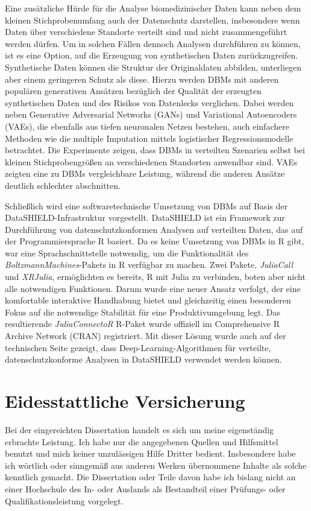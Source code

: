 \documentclass[12pt]{article}
\newcommand{\apkg}[1]{\emph{#1}}
\begin{document}
\begin{appendices}
Eine zusätzliche Hürde für die Analyse biomedizinischer Daten kann neben dem kleinen Stichprobenumfang auch der Datenschutz darstellen, insbesondere wenn Daten über verschiedene Standorte verteilt sind und nicht zusammengeführt werden dürfen.
Um in solchen Fällen dennoch Analysen durchführen zu können, ist es eine Option, auf die Erzeugung von synthetischen Daten zurückzugreifen.
Synthetische Daten können die Struktur der Originaldaten abbilden, unterliegen aber einem geringeren Schutz als diese.
Hierzu werden DBMs mit anderen populären generativen Ansätzen bezüglich der Qualität der erzeugten synthetischen Daten und des Risikos von Datenlecks verglichen.
Dabei werden neben Generative Adversarial Networks (GANs) und Variational Autoencoders (VAEs), die ebenfalls aus tiefen neuronalen Netzen bestehen, auch einfachere Methoden wie die multiple Imputation mittels logistischer Regressionsmodelle betrachtet.
Die Experimente zeigen, dass DBMs in verteilten Szenarien selbst bei kleinen Stichprobengrößen an verschiedenen Standorten anwendbar sind.
VAEs zeigten eine zu DBMs vergleichbare Leistung, während die anderen Ansätze deutlich schlechter abschnitten.

Schließlich wird eine softwaretechnische Umsetzung von DBMs auf Basis der DataSHIELD-Infrastruktur vorgestellt. DataSHIELD ist ein Framework zur Durchführung von datenschutzkonformen Analysen auf verteilten Daten, das auf der Programmiersprache R basiert.
Da es keine Umsetzung von DBMs in R gibt, war eine Sprachschnittstelle notwendig, um die Funktionalität des \apkg{BoltzmannMachines}-Pakets in R verfügbar zu machen.
Zwei Pakete, \apkg{JuliaCall} und \apkg{XRJulia}, ermöglichten es bereits, R mit Julia zu verbinden, boten aber nicht alle notwendigen Funktionen.
Darum wurde eine neuer Ansatz verfolgt, der eine komfortable interaktive Handhabung bietet und gleichzeitig einen besonderen Fokus auf die notwendige Stabilität für eine Produktivumgebung legt.
Das resultierende \apkg{JuliaConnectoR} R-Paket wurde offiziell im Comprehensive R Archive Network (CRAN) registriert.
Mit dieser Lösung wurde auch auf der technischen Seite gezeigt, dass Deep-Learning-Algorithmen für verteilte, datenschutzkonforme Analysen in DataSHIELD verwendet werden können.


\clearpage
\section{Eidesstattliche Versicherung}
Bei der eingereichten Dissertation handelt es sich um meine eigenständig erbrachte Leistung.
Ich habe nur die angegebenen Quellen und Hilfsmittel benutzt und mich keiner unzulässigen Hilfe Dritter bedient. Insbesondere habe ich wörtlich oder sinngemäß aus anderen Werken übernommene Inhalte als solche kenntlich gemacht.
Die Dissertation oder Teile davon habe ich bislang nicht an einer Hochschule des In- oder Auslands als Bestandteil einer Prüfungs- oder Qualifikationsleistung vorgelegt.


\end{appendices}
\end{document}
